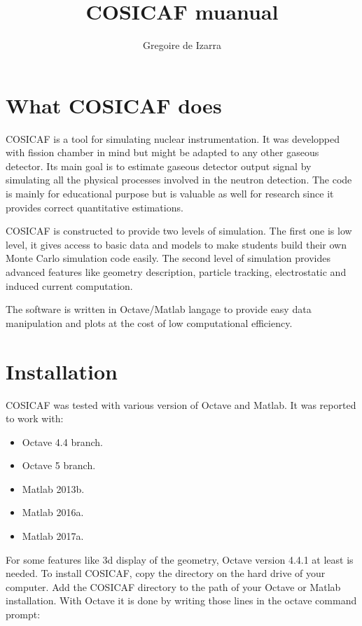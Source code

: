 \documentclass[10pt]{article}
\title{COSICAF muanual}
\author{Gregoire de Izarra}
\begin{document}
	\maketitle
	
	\tableofcontents
	\newpage
	\section{What COSICAF does}
	
	COSICAF is a tool for simulating nuclear instrumentation. It was developped with
	fission chamber in mind but might be adapted to any other gaseous detector.
	Its main goal is to estimate gaseous detector output signal by simulating all
	the physical processes involved in the neutron detection.
	The code is mainly for educational purpose but is valuable as well for research
	since it provides correct quantitative estimations.
	
	COSICAF is constructed to provide two levels of simulation. The first one is low
	level, it gives access to basic data and models to make students build their own
	Monte Carlo simulation code easily. The second level of simulation provides
	advanced  features like geometry description, particle tracking, electrostatic
	and induced current computation. 
	
	The software is written in Octave/Matlab langage to provide easy data manipulation
	and plots at the cost of low computational efficiency. 
	
	\section{Installation}
	
	COSICAF was tested with various version of Octave and Matlab. It was reported to work with:
	
	\begin{itemize}
		\item Octave 4.4 branch.
		\item Octave 5 branch.
		\item Matlab 2013b.
		\item Matlab 2016a.
		\item Matlab 2017a.  
	\end{itemize}
	
	 For some features like 3d display of the geometry, Octave version 4.4.1  at least is needed.
	 To install COSICAF, copy the directory on the hard drive of your computer. Add the COSICAF directory to the path of your Octave or Matlab installation. With Octave it is done by writing those lines in the octave command prompt:
	 
\end{document}
